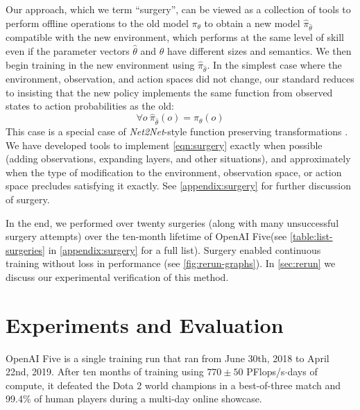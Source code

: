 \documentclass[11pt]{article}
\newcommand{\pflopsday}{\textrm{PFlops/s}$\cdot$\textrm{days}\xspace}
\newcommand{\totalcompute}{$770\pm50$ \pflopsday\xspace}
\newcommand{\dota}{Dota 2\xspace}
\newcommand{\openaifive}{OpenAI Five\xspace}
\begin{document}
Our approach, which we term ``surgery'', can be viewed as a collection of tools to perform offline operations to the old model $\pi_\theta$ to obtain a new model $\hat{\pi}_{\hat{\theta}}$ compatible with the new environment, which performs at the same level of skill even if the parameter vectors $\hat\theta$ and $\theta$ have different sizes and semantics. 
We then begin training in the new environment using $\hat\pi_{\hat\theta}$.
In the simplest case where the environment, observation, and action spaces did not change, our standard reduces to insisting that the new policy implements the same function from observed states to action probabilities as the old:
\begin{equation}\label{eqn:surgery}
    \forall o ~ \hat\pi_{\hat\theta}(o) = \pi_\theta(o)
\end{equation}
This case is a special case of {\it Net2Net}-style function preserving transformations \cite{chen15net2net}. 
We have developed tools to implement \autoref{eqn:surgery} exactly when possible (adding observations, expanding layers, and other situations), and approximately when the type of modification to the environment, observation space, or action space precludes satisfying it exactly. 
See \autoref{appendix:surgery} for further discussion of surgery.

In the end, we performed over twenty surgeries (along with many unsuccessful surgery attempts) over the ten-month lifetime of \openaifive (see \autoref{table:list-surgeries} in \autoref{appendix:surgery} for a full list). Surgery enabled continuous training without loss in performance (see \autoref{fig:rerun-graphs}). In \autoref{sec:rerun} we discuss our experimental verification of this method.

\section{Experiments and Evaluation}\label{sec:results}
\openaifive is a single training run that ran from June 30th, 2018 to April 22nd, 2019. 
After ten months of training using \totalcompute of compute, it defeated the \dota world champions in a best-of-three match and 99.4\% of human players during a multi-day online showcase.
\end{document}

